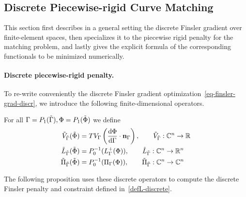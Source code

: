 \subsection{Discrete Piecewise-rigid Curve Matching}

This section first describes in a general setting the discrete Finsler gradient over finite-element spaces, then specializes it to the piecewise rigid penalty for the matching problem, and lastly gives the explicit formula of the corresponding functionals to be minimized numerically. 

\paragraph{Discrete piecewise-rigid penalty.}

To re-write conveniently the discrete Finsler gradient optimization~\eqref{eq-finsler-grad-discr}, we introduce the following finite-dimensional operators.

\begin{defn}\label{dfn-discr-op} For all $\Gamma=P_1(\tilde{\Gamma}), \Phi=P_1(\tilde{\Phi})$ we define
	\begin{align*}
		\tilde{V}_{\tilde{\Gamma}}(\tilde{\Phi}) &= TV_{\Gamma}\left(\frac{\mathrm{d} \Phi}{\mathrm{d} \Gamma}\cdot {\bf n}_{\Gamma} \right), \qquad \tilde{V}_{\tilde{\Gamma}}: \mathbb{C}^n\rightarrow \mathbb{R}   \\
		\tilde{L}_{\tilde{\Gamma}}(\tilde{\Phi}) &=P_0^{-1}(L_{\Gamma}^+(\Phi)),  
			\qquad \tilde{L}_{\tilde{\Gamma}}: \mathbb{C}^n\rightarrow \mathbb{R}^n \\
		\tilde{\Pi}_{\tilde{\Gamma}}(\tilde{\Phi}) &=P_0^{-1}(\Pi_{\Gamma}(\Phi)), 
			\qquad \tilde{\Pi}_{\tilde{\Gamma}}: \mathbb{C}^n\rightarrow \mathbb{C}^n
	\end{align*}
\end{defn}

The following proposition uses these discrete operators to compute the discrete Finsler penalty and constraint defined in~\eqref{defL-discrete}. 

